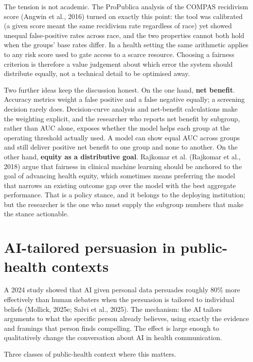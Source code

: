 \documentclass[
  letterpaper,
  11pt]{scrbook}
\newcounter{none} %
\begin{document}
The tension is not academic. The ProPublica analysis of the COMPAS
recidivism score (Angwin et al., 2016) turned on exactly this point: the
tool was calibrated (a given score meant the same recidivism rate
regardless of race) yet showed unequal false-positive rates across race,
and the two properties cannot both hold when the groups' base rates
differ. In a health setting the same arithmetic applies to any risk
score used to gate access to a scarce resource. Choosing a fairness
criterion is therefore a value judgement about which error the system
should distribute equally, not a technical detail to be optimised away.

Two further ideas keep the discussion honest. On the one hand,
\textbf{net benefit}. Accuracy metrics weight a false positive and a
false negative equally; a screening decision rarely does. Decision-curve
analysis and net-benefit calculations make the weighting explicit, and
the researcher who reports net benefit by subgroup, rather than AUC
alone, exposes whether the model helps each group at the operating
threshold actually used. A model can show equal AUC across groups and
still deliver positive net benefit to one group and none to another. On
the other hand, \textbf{equity as a distributive goal}. Rajkomar et al.
(Rajkomar et al., 2018) argue that fairness in clinical machine learning
should be anchored to the goal of advancing health equity, which
sometimes means preferring the model that narrows an existing outcome
gap over the model with the best aggregate performance. That is a policy
stance, and it belongs to the deploying institution; but the researcher
is the one who must supply the subgroup numbers that make the stance
actionable.

\section{AI-tailored persuasion in public-health
contexts}\label{ai-tailored-persuasion-in-public-health-contexts}

A 2024 study showed that AI given personal data persuades roughly 80\%
more effectively than human debaters when the persuasion is tailored to
individual beliefs (Mollick, 2025e; Salvi et al., 2025). The mechanism:
the AI tailors arguments to what the specific person already believes,
using exactly the evidence and framings that person finds compelling.
The effect is large enough to qualitatively change the conversation
about AI in health communication.

Three classes of public-health context where this matters.
\end{document}
